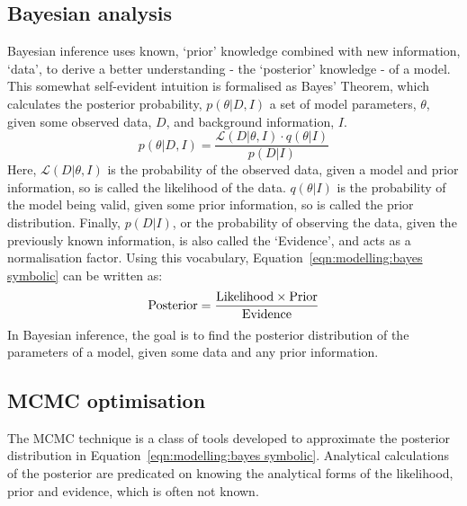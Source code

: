 \subsection{Bayesian analysis}
\label{sect:modelling:Bayesian analysis}
Bayesian inference uses known, `prior' knowledge combined with new information, `data', to derive a better understanding - the `posterior' knowledge - of a model. This somewhat self-evident intuition is formalised as Bayes' Theorem, which calculates the posterior probability, $p(\theta | D, I)$ a set of model parameters, $\theta$, given some observed data, $D$, and background information, $I$.
\begin{equation}
    \label{eqn:modelling:bayes symbolic}
    p(\theta | D,I) = \frac{\mathcal{L}(D | \theta, I) \cdot q(\theta | I)}{p(D|I)}
\end{equation}
Here, $\mathcal{L}(D | \theta, I)$ is the probability of the observed data, given a model and prior information, so is called the likelihood of the data.
$q(\theta|I)$ is the probability of the model being valid, given some prior information, so is called the prior distribution. Finally, $p(D | I)$, or the probability of observing the data, given the previously known information, is also called the `Evidence', and acts as a normalisation factor. Using this vocabulary, Equation~\ref{eqn:modelling:bayes symbolic} can be written as:
\begin{equation}
    \label{eqn:modelling:bayes english}
    \rm Posterior = \frac{Likelihood \times Prior}{Evidence}
\end{equation}
In Bayesian inference, the goal is to find the posterior distribution of the parameters of a model, given some data and any prior information.


\subsection{MCMC optimisation}
\label{sect:modelling:affine invariant MCMC}
The MCMC technique is a class of tools developed to approximate the posterior distribution in Equation~\ref{eqn:modelling:bayes symbolic}. Analytical calculations of the posterior are predicated on knowing the analytical forms of the likelihood, prior and evidence, which is often not known.

